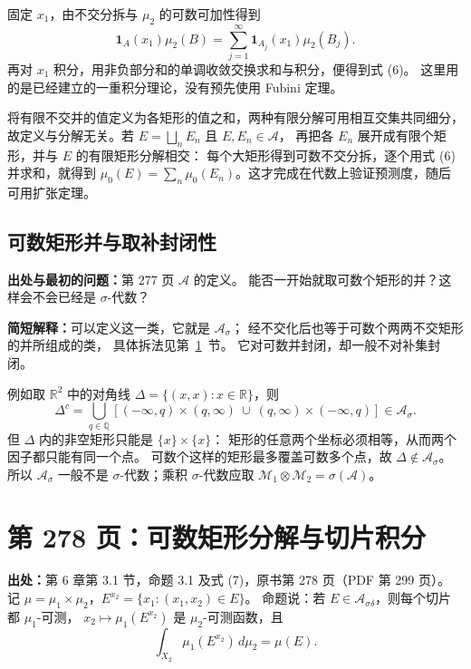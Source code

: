 \documentclass[UTF8,a4paper,11pt]{ctexart}
\begin{document}
固定 $x_1$，由不交分拆与 $\mu_2$ 的可数可加性得到
\[
\mathbf1_A(x_1)\mu_2(B)=
\sum_{j=1}^{\infty}\mathbf1_{A_j}(x_1)\mu_2(B_j).
\]
再对 $x_1$ 积分，用非负部分和的单调收敛交换求和与积分，便得到式 (6)。
这里用的是已经建立的一重积分理论，没有预先使用 Fubini 定理。

将有限不交并的值定义为各矩形的值之和，两种有限分解可用相互交集共同细分，
故定义与分解无关。若 $E=\bigsqcup_nE_n$ 且 $E,E_n\in\mathcal A$，
再把各 $E_n$ 展开成有限个矩形，并与 $E$ 的有限矩形分解相交：
每个大矩形得到可数不交分拆，逐个用式 (6) 并求和，就得到
$\mu_0(E)=\sum_n\mu_0(E_n)$。这才完成在代数上验证预测度，随后可用扩张定理。

\subsection{可数矩形并与取补封闭性}
\label{note:stein-ch6-p277-countable-rectangle-unions}
\textbf{出处与最初的问题：}第 277 页 $\mathcal A$ 的定义。
能否一开始就取可数个矩形的并？这样会不会已经是 $\sigma$-代数？

\textbf{简短解释：}可以定义这一类，它就是 $\mathcal A_\sigma$；
经不交化后也等于可数个两两不交矩形的并所组成的类，
具体拆法见第~\ref{note:stein-ch6-p278-slices}~节。
它对可数并封闭，却一般不对补集封闭。

例如取 $\mathbb R^2$ 中的对角线 $\Delta=\{(x,x):x\in\mathbb R\}$，则
\[
\Delta^c=\bigcup_{q\in\mathbb Q}
\left[(-\infty,q)\times(q,\infty)\ \cup\
(q,\infty)\times(-\infty,q)\right]\in\mathcal A_\sigma.
\]
但 $\Delta$ 内的非空矩形只能是 $\{x\}\times\{x\}$：
矩形的任意两个坐标必须相等，从而两个因子都只能有同一个点。
可数个这样的矩形最多覆盖可数多个点，故 $\Delta\notin\mathcal A_\sigma$。
所以 $\mathcal A_\sigma$ 一般不是 $\sigma$-代数；乘积 $\sigma$-代数应取
$\mathcal M_1\otimes\mathcal M_2=\sigma(\mathcal A)$。

\newpage
\section{第 278 页：可数矩形分解与切片积分}
\label{note:stein-ch6-p278-slices}
\textbf{出处：}第 6 章第 3.1 节，命题 3.1 及式 (7)，原书第 278 页（PDF 第 299 页）。
记 $\mu=\mu_1\times\mu_2$，$E^{x_2}=\{x_1:(x_1,x_2)\in E\}$。
命题说：若 $E\in\mathcal A_{\sigma\delta}$，则每个切片都 $\mu_1$-可测，
$x_2\mapsto\mu_1(E^{x_2})$ 是 $\mu_2$-可测函数，且
\[
\int_{X_2}\mu_1(E^{x_2})\,d\mu_2=\mu(E).
\]
\end{document}
